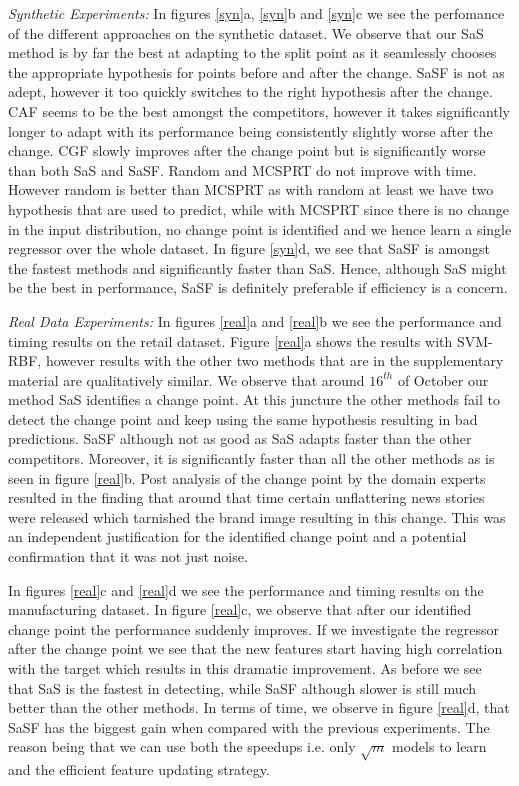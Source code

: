 \documentclass{article}
\begin{document}
\noindent\textit{Synthetic Experiments:} In figures \ref{syn}a, \ref{syn}b and \ref{syn}c we see the perfomance of the different approaches on the synthetic dataset. We observe that our SaS method is by far the best at adapting to the split point as it seamlessly chooses the appropriate hypothesis for points before and after the change. SaSF is not as adept, however it too quickly switches to the right hypothesis after the change. CAF seems to be the best amongst the competitors, however it takes significantly longer to adapt with its performance being consistently slightly worse after the change. CGF slowly improves after the change point but is significantly worse than both SaS and SaSF. Random and MCSPRT do not improve with time. However random is better than MCSPRT as with random at least we have two hypothesis that are used to predict, while with MCSPRT since there is no change in the input distribution, no change point is identified and we hence learn a single regressor over the whole dataset. In figure \ref{syn}d, we see that SaSF is amongst the fastest methods and significantly faster than SaS. Hence, although SaS might be the best in performance, SaSF is definitely preferable if efficiency is a concern.

\noindent\textit{Real Data Experiments:} In figures \ref{real}a and \ref{real}b we see the performance and timing results on the retail dataset. Figure \ref{real}a shows the results with SVM-RBF, however results with the other two methods that are in the supplementary material are qualitatively similar. We observe that around $16^{th}$ of October our method SaS identifies a change point. At this juncture the other methods fail to detect the change point and keep using the same hypothesis resulting in bad predictions. SaSF although not as good as SaS adapts faster than the other competitors. Moreover, it is significantly faster than all the other methods as is seen in figure \ref{real}b. Post analysis of the change point by the domain experts resulted in the finding that around that time certain unflattering news stories were released which tarnished the brand image resulting in this change. This was an independent justification for the identified change point and a potential confirmation that it was not just noise.

In figures \ref{real}c and \ref{real}d we see the performance and timing results on the manufacturing dataset. In figure \ref{real}c, we observe that after our identified change point the performance suddenly improves. If we investigate the regressor after the change point we see that the new features start having high correlation with the target which results in this dramatic improvement. As before we see that SaS is the fastest in detecting, while SaSF although slower is still much better than the other methods. In terms of time, we observe in figure \ref{real}d, that SaSF has the biggest gain when compared with the previous experiments. The reason being that we can use both the speedups i.e. only $\sqrt{m}$ models to learn and the efficient feature updating strategy.
\end{document}
